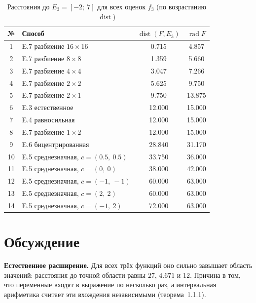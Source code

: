 \documentclass[a4paper, 14pt]{extarticle}
\begin{document}
\begin{table}[H]
    \centering
    \small
    \caption{Расстояния до $E_3 = [-2;\ 7]$ для всех оценок $f_3$ (по возрастанию $\operatorname{dist}$)}
    \label{tab:f3sum}
    \begin{tabular}{|c|l|c|c|}
        \hline
        № & Способ & $\operatorname{dist}(F, E_3)$ & $\operatorname{rad}F$ \\ \hline
        1 & E.7 разбиение $16\times16$ & 0.715 & 4.857 \\ \hline
        2 & E.7 разбиение $8\times8$ & 1.359 & 5.660 \\ \hline
        3 & E.7 разбиение $4\times4$ & 3.047 & 7.266 \\ \hline
        4 & E.7 разбиение $2\times2$ & 5.625 & 9.750 \\ \hline
        5 & E.7 разбиение $2\times1$ & 9.750 & 13.875 \\ \hline
        6 & E.3 естественное & 12.000 & 15.000 \\ \hline
        7 & E.4 равносильная & 12.000 & 15.000 \\ \hline
        8 & E.7 разбиение $1\times2$ & 12.000 & 15.000 \\ \hline
        9 & E.6 бицентрированная & 28.840 & 31.170 \\ \hline
        10 & E.5 среднезначная, $c=(0.5,\ 0.5)$ & 33.750 & 36.000 \\ \hline
        11 & E.5 среднезначная, $c=(0,\ 0)$ & 38.000 & 42.000 \\ \hline
        12 & E.5 среднезначная, $c=(-1,\ -1)$ & 60.000 & 63.000 \\ \hline
        13 & E.5 среднезначная, $c=(2,\ 2)$ & 60.000 & 63.000 \\ \hline
        14 & E.5 среднезначная, $c=(-1,\ 2)$ & 72.000 & 63.000 \\ \hline
    \end{tabular}
\end{table}


\section{Обсуждение}

\textbf{Естественное расширение.} Для всех трёх функций оно сильно завышает область значений: расстояния до точной области равны $27$, $4.671$ и $12$. Причина в том, что переменные входят в выражение по несколько раз, а интервальная арифметика считает эти вхождения независимыми (теорема~1.1.1).
\end{document}

